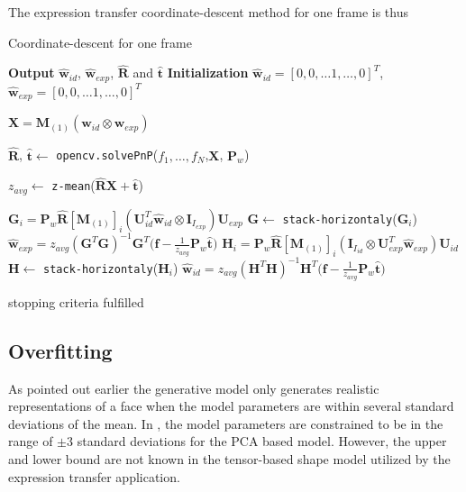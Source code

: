 \documentclass[11pt,a4paper]{report}
\begin{document}
The expression transfer coordinate-descent method for one frame is thus
\begin{algorithm}\label{a:coorddesc}
\caption{Coordinate-descent for one frame}
\begin{algorithmic}[1]

\State \textbf{Output} $\mathbf{\hat{w}}_{id}$, $\mathbf{\hat{w}}_{exp}$,
$\mathbf{\hat{R}}$ and $\mathbf{\hat{t}}$
\State \textbf{Initialization} $\mathbf{\hat{w}}_{id} = [0,0, \ldots 1, \ldots
  ,0]^T$, $\mathbf{\hat{w}}_{exp} = [0,0, \ldots 1, \ldots ,0]^T$
\Repeat

\State $\mathbf{X} = \mathbf{M}_{(1)}(\mathbf{w}_{id} \otimes \mathbf{w}_{exp})$ 

\State $\mathbf{\hat{R}}$, $\mathbf{\hat{t}} \gets $
\texttt{opencv.solvePnP}($f_1, \ldots ,f_N$,$\mathbf{X}$, $\mathbf{P}_w$)

\State

\State $z_{avg} \gets$ \texttt{z-mean}($\mathbf{\hat{R}}\mathbf{X} + \mathbf{\hat{t}}$)

\State

\State $\mathbf{G}_i = \mathbf{P}_w\mathbf{\hat{R}}[\mathbf{M}_{(1)}]_{i}(\mathbf{U}_{id}^T\mathbf{\hat{w}}_{id}
\otimes \mathbf{I}_{I_{exp}})\mathbf{U}_{exp}$
\State $\mathbf{G} \gets $ \texttt{stack-horizontaly}($\mathbf{G}_i$)
\State
\State $\mathbf{\hat{w}}_{exp} = z_{avg}(\mathbf{G}^T\mathbf{G})^{-1}\mathbf{G}^T\bigl(\mathbf{f} - \frac{1}{z_{avg}}\mathbf{P}_w\mathbf{\hat{t}}\bigr)$
\State
\State $\mathbf{H}_i = \mathbf{P}_w\mathbf{\hat{R}}[\mathbf{M}_{(1)}]_{i}(\mathbf{I}_{I_{id}}
\otimes \mathbf{U}_{exp}^T\mathbf{\hat{w}}_{exp})\mathbf{U}_{id}$
\State $\mathbf{H} \gets $ \texttt{stack-horizontaly}($\mathbf{H}_i$)
\State
\State $\mathbf{\hat{w}}_{id} = z_{avg}(\mathbf{H}^T\mathbf{H})^{-1}\mathbf{H}^T\bigl(\mathbf{f} - \frac{1}{z_{avg}}\mathbf{P}_w\mathbf{\hat{t}}\bigr)$

\Until stopping criteria fulfilled

\EndProcedure
\end{algorithmic}
\end{algorithm}

\subsection{Overfitting}
As pointed out earlier the generative model only generates realistic
representations of a face when the model parameters are within several standard
deviations of the mean. In \cite{blanz1}, \cite{jacey} the model parameters are constrained to
be in the range of $\pm$3 standard deviations for the PCA based model. However, the upper and
lower bound are not known in the tensor-based shape model utilized by the
expression transfer application. 
\end{document}
